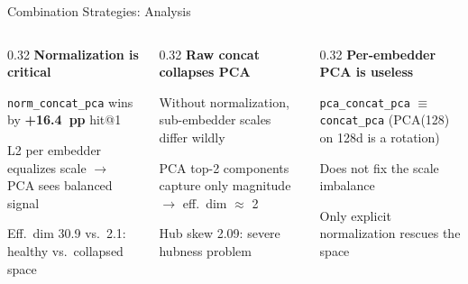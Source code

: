 \documentclass[aspectratio=169,10pt]{beamer}
\begin{document}
\begin{frame}{Combination Strategies: Analysis}

  \begin{columns}[T]
  \begin{column}{0.32\textwidth}
    {\small\textbf{\textcolor{hit}{Normalization is critical}}}
    \begin{itemize}\setlength{\itemsep}{2pt}
      {\scriptsize
      \item \texttt{norm\_concat\_pca} wins by \textbf{+16.4~pp} hit@1
      \item L2 per embedder equalizes scale $\to$ PCA sees balanced signal
      \item Eff.\ dim 30.9 vs.\ 2.1: healthy vs.\ collapsed space}
    \end{itemize}
  \end{column}
  \begin{column}{0.32\textwidth}
    {\small\textbf{\textcolor{miss}{Raw concat collapses PCA}}}
    \begin{itemize}\setlength{\itemsep}{2pt}
      {\scriptsize
      \item Without normalization, sub-embedder scales differ wildly
      \item PCA top-2 components capture only magnitude $\to$ eff.\ dim $\approx$ 2
      \item Hub skew 2.09: severe hubness problem}
    \end{itemize}
  \end{column}
  \begin{column}{0.32\textwidth}
    {\small\textbf{\textcolor{c1}{Per-embedder PCA is useless}}}
    \begin{itemize}\setlength{\itemsep}{2pt}
      {\scriptsize
      \item \texttt{pca\_concat\_pca} $\equiv$ \texttt{concat\_pca} (PCA(128) on 128d is a rotation)
      \item Does not fix the scale imbalance
      \item Only explicit normalization rescues the space}
    \end{itemize}
  \end{column}
  \end{columns}

\end{frame}
\end{document}

